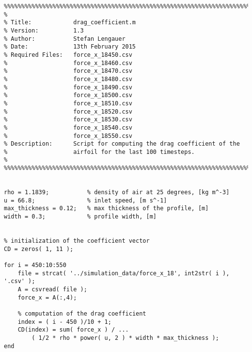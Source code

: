 \newpage
\begin{lstlisting}
%%%%%%%%%%%%%%%%%%%%%%%%%%%%%%%%%%%%%%%%%%%%%%%%%%%%%%%%%%%%%%%%%%%%%%%%%%%
%
% Title:            drag_coefficient.m
% Version:          1.3
% Author:           Stefan Lengauer
% Date:             13th February 2015
% Required Files:   force_x_18450.csv
%                   force_x_18460.csv
%                   force_x_18470.csv
%                   force_x_18480.csv
%                   force_x_18490.csv
%                   force_x_18500.csv
%                   force_x_18510.csv
%                   force_x_18520.csv
%                   force_x_18530.csv
%                   force_x_18540.csv
%                   force_x_18550.csv
% Description:      Script for computing the drag coefficient of the 
%                   airfoil for the last 100 timesteps.
%
%%%%%%%%%%%%%%%%%%%%%%%%%%%%%%%%%%%%%%%%%%%%%%%%%%%%%%%%%%%%%%%%%%%%%%%%%%%


rho = 1.1839;           % density of air at 25 degrees, [kg m^-3]
u = 66.8;               % inlet speed, [m s^-1]
max_thickness = 0.12;   % max thickness of the profile, [m]
width = 0.3;            % profile width, [m]


% initialization of the coefficient vector
CD = zeros( 1, 11 );

for i = 450:10:550
    file = strcat( '../simulation_data/force_x_18', int2str( i ), '.csv' );
    A = csvread( file );
    force_x = A(:,4);
    
    % computation of the drag coefficient
    index = ( i - 450 )/10 + 1;
    CD(index) = sum( force_x ) / ...
        ( 1/2 * rho * power( u, 2 ) * width * max_thickness );
end
\end{lstlisting}